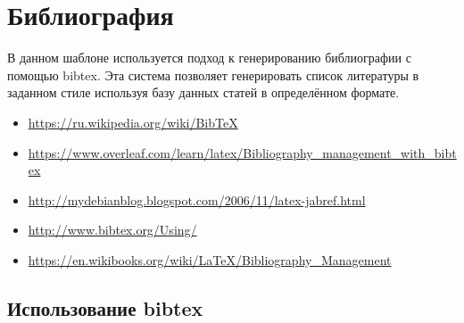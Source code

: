 \chapter{Библиография}\label{ch:bib}



В данном шаблоне используется подход к генерированию библиографии с помощью bibtex. Эта система позволяет генерировать список литературы в заданном стиле используя базу данных статей в определённом формате.

\begin{itemize}
	\item \href{https://ru.wikipedia.org/wiki/BibTeX}{https://ru.wikipedia.org/wiki/BibTeX}
	\item  \href{https://www.overleaf.com/learn/latex/Bibliography_management_with_bibtex}{\small https://www.overleaf.com/learn/latex/Bibliography\_management\_with\_bibtex}
	\item \href{http://mydebianblog.blogspot.com/2006/11/latex-jabref.html}{http://mydebianblog.blogspot.com/2006/11/latex-jabref.html}
	\item 	\href{http://www.bibtex.org/Using/}{http://www.bibtex.org/Using/}
	\item \href{https://en.wikibooks.org/wiki/LaTeX/Bibliography_Management}{https://en.wikibooks.org/wiki/LaTeX/Bibliography\_Management}
\end{itemize}

\section{Использование bibtex}

